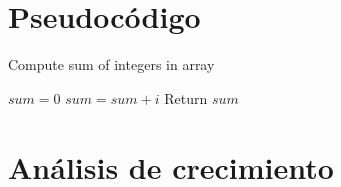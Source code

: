 \documentclass{article}
\begin{document}
\section{Pseudocódigo}
\begin{algorithm}
    \caption{Compute sum of integers in array}
        \label{array-sum}
        \begin{algorithmic}[1]
            \State $sum = 0$
                \State $sum = sum + i$
            \EndFor
            \State Return $sum$
            \EndProcedure
        \end{algorithmic}
    \end{algorithm}
\section{Análisis de crecimiento}
\end{document}
